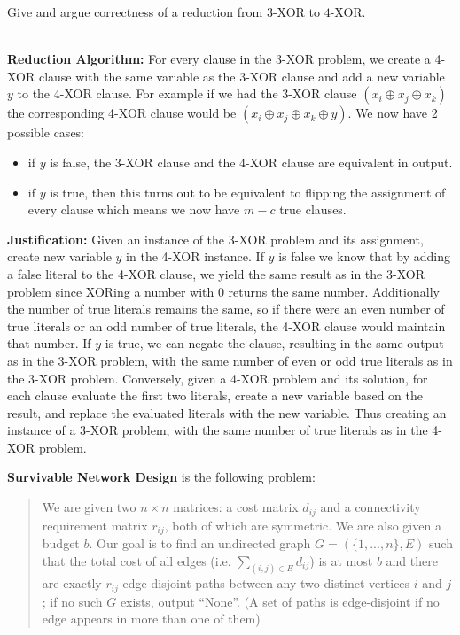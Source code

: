 \documentclass[11pt]{article}
\begin{document}
\begin{subparts}
\subpart Give and argue correctness of a reduction from $3$-XOR to $4$-XOR.\\
\begin{solution}\\
    \textbf{Reduction Algorithm:} For every clause in the 3-XOR problem, we create a 4-XOR clause with the same variable as the 3-XOR clause
    and add a new variable $y$ to the 4-XOR clause. For example if we had the 3-XOR clause $(x_i \oplus x_j \oplus x_k)$ the corresponding 4-XOR clause would be $(x_i \oplus x_j \oplus x_k \oplus y)$.
    We now have 2 possible cases:
    \begin{itemize}
        \item if $y$ is false, the 3-XOR clause and the 4-XOR clause are equivalent in output.
        \item if $y$ is true, then this turns out to be equivalent to flipping the assignment of every clause which means we now have $m-c$ true clauses.
    \end{itemize}
    \textbf{Justification:} Given an instance of the 3-XOR problem and its assignment, create new variable $y$ in the 4-XOR instance. If $y$ is false
    we know that by adding a false literal to the 4-XOR clause, we yield the same result as in the 3-XOR problem since XORing a number with 0 returns the same number. 
    Additionally the number of true literals remains the same, so if there were an even number of true literals or an odd number of true literals, 
    the 4-XOR clause would maintain that number. If $y$ is true, we can negate the clause, resulting in the same output as in the 3-XOR problem, with the same number of 
    even or odd true literals as in the 3-XOR problem. Conversely, given a 4-XOR problem and its solution, for each clause evaluate the first two literals, create a new variable based on the result, and
    replace the evaluated literals with the new variable. Thus creating an instance of a 3-XOR problem, with the same number of true literals as in
    the 4-XOR problem. 
\end{solution}
\end{subparts}

\newpage

\textbf{Survivable Network Design} is the following problem:

\begin{quote}We are given two $n \times n$ matrices: a cost matrix $d_{ij}$ and a connectivity requirement matrix $r_{ij}$, both of which are symmetric. We are also given a budget $b$.
Our goal is to find an undirected graph $G = (\{1,...,n\}, E)$ such that the total cost of all edges (i.e. $\sum_{(i,j) \in E} d_{ij}$) is at most $b$ and there are exactly $r_{ij}$
edge-disjoint paths between any two distinct vertices $i$ and $j$; if no such $G$ exists, output ``None''. (A set of paths is edge-disjoint if no edge appears in more than one of them)
\end{quote}
\end{document}
